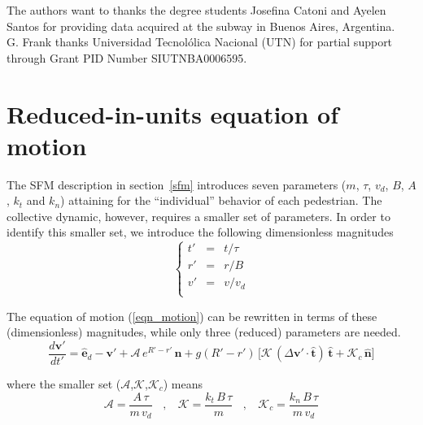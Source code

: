 \documentclass[preprint,12pt]{elsarticle}
\begin{document}
The authors want to thanks the degree students Josefina Catoni and Ayelen Santos
 for providing data acquired at the subway in Buenos Aires, Argentina. \\

G. Frank thanks Universidad Tecnol\'olica Nacional (UTN) for partial
support through Grant PID Number SIUTNBA0006595.

\appendix

\section{\label{appendix1}Reduced-in-units equation of motion}

The SFM description in section~\ref{sfm} introduces seven parameters ($m$, 
$\tau$, $v_d$, $B$, $A$, $k_t$ and $k_n$) attaining for the ``individual'' 
behavior of each pedestrian. The collective dynamic, however, requires a 
smaller set of parameters. In order to identify this smaller set, we introduce 
the following dimensionless magnitudes\\

\begin{equation}
 \left\{\begin{array}{lcl}
         t' & = & t/\tau \\
         r' & = & r/B \\
         v' & = & v/v_d \\
        \end{array}\right.
\end{equation}

The equation of motion (\ref{eqn_motion}) can be rewritten in terms of these 
(dimensionless) magnitudes, while only three (reduced) parameters are needed.\\


\begin{equation}
 \displaystyle\frac{d\mathbf{v}'}{dt'}=
 \hat{\mathbf{e}}_d-\mathbf{v}'+\mathcal{A}\,e^{R'-r'}\,
 \hat{\mathbf{n}}+g(R'-r')\,\bigg[\mathcal{K}\,(\Delta\mathbf{v}'\cdot
 \hat{\mathbf{t}})\,\hat{\mathbf{t}}+\mathcal{K}_c\,\hat{\mathbf{n}}\bigg]
\end{equation}



\noindent where the smaller set ($\mathcal{A}$,$\mathcal{K}$,$\mathcal{K}_c$) 
means\\

\begin{equation}
 \mathcal{A}=\displaystyle\frac{A\,\tau}{m\,v_d}\ \ \ \ , \ \ \ \ 
 \mathcal{K}=\displaystyle\frac{k_t\,B\,\tau}{m}\ \ \ \ , \ \ \ \
 \mathcal{K}_c=\displaystyle\frac{k_n\,B\,\tau}{m\,v_d}
\end{equation}
\end{document}
